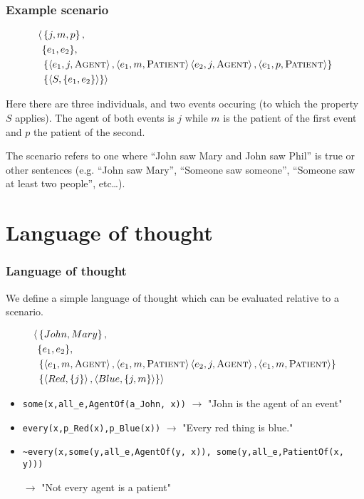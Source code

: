 \documentclass[aspectratio=169]{beamer}
\begin{document}
\begin{frame}
  \frametitle{Example scenario}
\begin{align*}
  \langle&\left\{j, m, p\right\}, \\
         &\{e_1, e_2\}, \\
    &\left\{
      \left\langle e_1, j, \textsc{Agent} \right\rangle, \left\langle e_1, m, \textsc{Patient} \right\rangle 
    \left\langle e_2, j, \textsc{Agent} \right\rangle, \left\langle e_1, p, \textsc{Patient} \right\rangle \right\} \\
    &\left\{ \left\langle S, \left\{ e_1, e_2 \right\} \right\rangle\right\}\rangle
\end{align*}

Here there are three individuals, and two events occuring (to which the property $S$ applies). 
The agent of both events is $j$ while $m$ is the patient of the first event and $p$ the patient of the second. 

The scenario refers to one where ``John saw Mary and John saw Phil'' is true or other sentences (e.g. ``John saw Mary'', ``Someone saw someone'', ``Someone saw at least two people'', etc\ldots).
\end{frame}


\section{Language of thought}
\begin{frame}[fragile]
  \frametitle{Language of thought}
  We define a simple language of thought which can be evaluated relative to a scenario. 
      \begin{small}
\begin{align*}
  \langle&\left\{John, Mary\right\}, \\
         &\{e_1, e_2\}, \\
    &\left\{
      \left\langle e_1, m, \textsc{Agent} \right\rangle, \left\langle e_1, m, \textsc{Patient} \right\rangle 
    \left\langle e_2, j, \textsc{Agent} \right\rangle, \left\langle e_1, m, \textsc{Patient} \right\rangle \right\} \\
    &\left\{ \left\langle Red, \left\{ j \right\} \right\rangle, \left\langle Blue, \left\{ j, m\right\} \right\rangle \right\}\rangle
\end{align*}
\vspace{-1em}
    \begin{itemize}
      \item \lstinline{some(x,all_e,AgentOf(a_John, x))}
        $\rightarrow$ "John is the agent of an event"
      \item \lstinline{every(x,p_Red(x),p_Blue(x))}
        $\rightarrow$ "Every red thing is blue."
      \item \begin{tiny}\lstinline{~every(x,some(y,all_e,AgentOf(y, x)), some(y,all_e,PatientOf(x, y))) }\end{tiny}
        $\rightarrow$ "Not every agent is a patient"
    \end{itemize}
  \end{small}
\end{frame}
\end{document}
